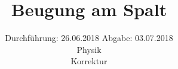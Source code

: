 

\subject{406}
\title{Beugung am Spalt}
\date{%
  Durchführung: 26.06.2018
  \hspace{3em}
  Abgabe: 03.07.2018 \\
  Physik \\
  Korrektur
}



\maketitle
\thispagestyle{empty}
\tableofcontents
\newpage






\printbibliography{}


